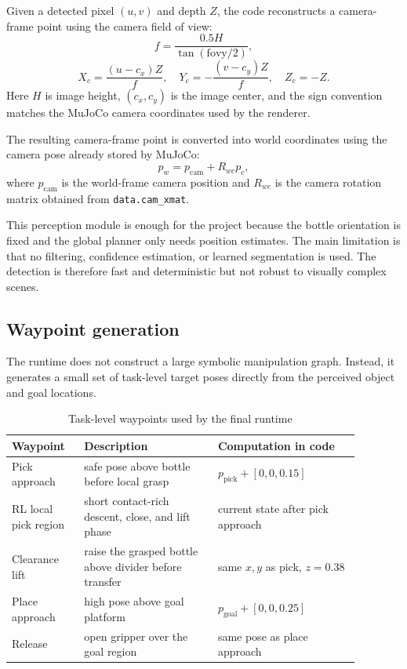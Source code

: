 \documentclass[11pt]{article}
\begin{document}
Given a detected pixel \((u,v)\) and depth \(Z\), the code reconstructs a camera-frame point using the camera field of view:
\[
f = \frac{0.5H}{\tan(\text{fovy}/2)},
\]
\[
X_c = \frac{(u-c_x)Z}{f}, \quad
Y_c = -\frac{(v-c_y)Z}{f}, \quad
Z_c = -Z.
\]
Here \(H\) is image height, \((c_x,c_y)\) is the image center, and the sign convention matches the MuJoCo camera coordinates used by the renderer.

The resulting camera-frame point is converted into world coordinates using the camera pose already stored by MuJoCo:
\[
p_w = p_{\text{cam}} + R_{wc} p_c,
\]
where \(p_{\text{cam}}\) is the world-frame camera position and \(R_{wc}\) is the camera rotation matrix obtained from \texttt{data.cam\_xmat}.

This perception module is enough for the project because the bottle orientation is fixed and the global planner only needs position estimates. The main limitation is that no filtering, confidence estimation, or learned segmentation is used. The detection is therefore fast and deterministic but not robust to visually complex scenes.

\subsection{Waypoint generation}

The runtime does not construct a large symbolic manipulation graph. Instead, it generates a small set of task-level target poses directly from the perceived object and goal locations.

\begin{table}[H]
  \caption{Task-level waypoints used by the final runtime}
  \label{tab:waypoints}
  \centering
  \begin{tabular}{>{\raggedright\arraybackslash}p{0.18\linewidth} >{\raggedright\arraybackslash}p{0.34\linewidth} >{\raggedright\arraybackslash}p{0.36\linewidth}}
    \toprule
    Waypoint & Description & Computation in code \\
    \midrule
    Pick approach & safe pose above bottle before local grasp & \(p_{\text{pick}} + [0, 0, 0.15]\) \\
    RL local pick region & short contact-rich descent, close, and lift phase & current state after pick approach \\
    Clearance lift & raise the grasped bottle above divider before transfer & same \(x,y\) as pick, \(z = 0.38\) \\
    Place approach & high pose above goal platform & \(p_{\text{goal}} + [0, 0, 0.25]\) \\
    Release & open gripper over the goal region & same pose as place approach \\
    \bottomrule
  \end{tabular}
\end{table}
\end{document}
